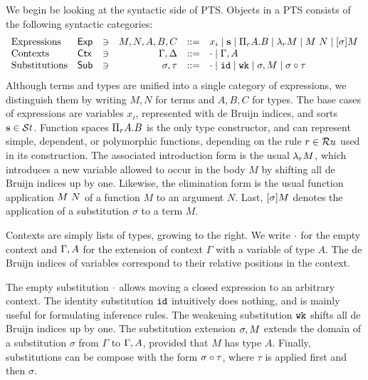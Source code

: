 We begin be looking at the syntactic side of \ac{PTS}.
Objects in a \ac{PTS} consists of the following syntactic categories:
\[
\begin{array}{llcrcl}
  \mbox{Expressions}       & \Exp & \ni & M,N,A,B,C      & ::=  & x_i \mid \tmcst s \mid \tppi A B \mid \tmlam M \mid \tmapp M N \mid \tmclo \sigma M \\
  \mbox{Contexts}          & \Ctx & \ni & \Gamma, \Delta & ::=  & \ctxempty \mid \ctxext\Gamma A \\
  \mbox{Substitutions}     & \Sub & \ni & \sigma, \tau   & ::=  & \subempty \mid \subid \mid \subwk \mid \subext \sigma M \mid \subclo \sigma \tau
\end{array}
\]
Although terms and types are unified into a single category of expressions, we distinguish them by writing $M,N$ for terms and $A,B,C$ for types.
The base cases of expressions are variables $x_i$, represented with de Bruijn indices, and sorts $\textbf{s} \in \mathcal{S}t$.
Function spaces $\tppi A B$ is the only type constructor, and can represent simple, dependent, or polymorphic functions, depending on the rule $r \in \mathcal{R}u$ used in its construction.
The associated introduction form is the usual $\tmlam M$, which introduces a new variable allowed to occur in the body $M$ by shifting all de Bruijn indices up by one.
Likewise, the elimination form is the usual function application $M~N$ of a function $M$ to an argument $N$.
Last, $[\sigma]M$ denotes the application of a substitution $\sigma$ to a term $M$.

Contexts are simply lists of types, growing to the right.
We write $\cdot$ for the empty context and $\Gamma, A$ for the extension of context $\Gamma$ with a variable of type $A$.
The de Bruijn indices of variables correspond to their relative positions in the context.

The empty substitution $\cdot$ allows moving a closed expression to an arbitrary context.
The identity substitution $\texttt{id}$ intuitively does nothing, and is mainly useful for formulating inference rules.
The weakening substitution $\texttt{wk}$ shifts all de Bruijn indices up by one.
The substitution extension $\sigma, M$ extends the domain of a substitution $\sigma$ from $\Gamma$ to $\Gamma, A$, provided that $M$ has type $A$.
Finally, substitutions can be compose with the form $\sigma \circ \tau$, where $\tau$ is applied first and then $\sigma$.





